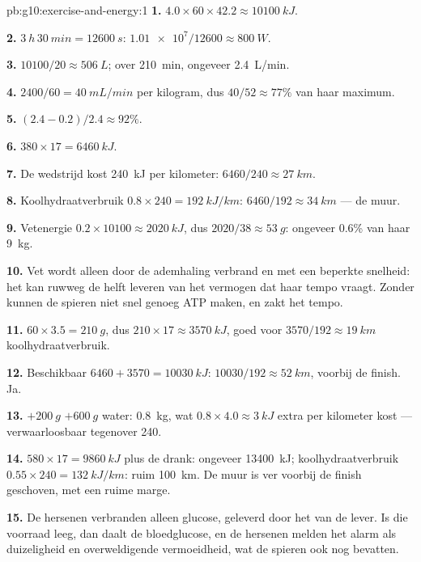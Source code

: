 \begin{solution}{pb:g10:exercise-and-energy:1}
\textbf{1.} $4.0 \times 60 \times 42.2 \approx \qty{10100}{kJ}$.

\textbf{2.} $\qty{3}{h}\,\qty{30}{min} = \qty{12600}{s}$:
$\num{1.01e7}/12600 \approx \qty{800}{W}$.

\textbf{3.} $10100/20 \approx \qty{506}{L}$; over \qty{210}{min},
ongeveer \qty{2.4}{L/min}.

\textbf{4.} $2400/60 = \qty{40}{mL/min}$ per kilogram, dus $40/52
\approx 77\%$ van haar maximum.

\textbf{5.} $(2.4 - 0.2)/2.4 \approx 92\%$.

\textbf{6.} $380 \times 17 = \qty{6460}{kJ}$.

\textbf{7.} De wedstrijd kost \qty{240}{kJ} per kilometer: $6460/240
\approx \qty{27}{km}$.

\textbf{8.} Koolhydraatverbruik $0.8 \times 240 = \qty{192}{kJ/km}$:
$6460/192 \approx \qty{34}{km}$ --- de muur.

\textbf{9.} Vetenergie $0.2 \times 10100 \approx \qty{2020}{kJ}$, dus
$2020/38 \approx \qty{53}{g}$: ongeveer 0.6\% van haar \qty{9}{kg}.

\textbf{10.} Vet wordt alleen door de ademhaling verbrand en met een
beperkte snelheid: het kan ruwweg de helft leveren van het vermogen dat
haar tempo vraagt. Zonder  kunnen de spieren niet snel genoeg
ATP maken, en zakt het tempo.

\textbf{11.} $60 \times 3.5 = \qty{210}{g}$, dus $210 \times 17 \approx
\qty{3570}{kJ}$, goed voor $3570/192 \approx \qty{19}{km}$
koolhydraatverbruik.

\textbf{12.} Beschikbaar  $6460 + 3570 = \qty{10030}{kJ}$:
$10030/192 \approx \qty{52}{km}$, voorbij de finish. Ja.

\textbf{13.} $+\qty{200}{g}$  $+ \qty{600}{g}$ water:
\qty{0.8}{kg}, wat $0.8 \times 4.0 \approx \qty{3}{kJ}$ extra per
kilometer kost --- verwaarloosbaar tegenover 240.

\textbf{14.}  $580 \times 17 = \qty{9860}{kJ}$ plus de drank:
ongeveer \qty{13400}{kJ}; koolhydraatverbruik $0.55 \times 240 =
\qty{132}{kJ/km}$: ruim \qty{100}{km}. De muur is ver voorbij de finish
geschoven, met een ruime marge.

\textbf{15.} De hersenen verbranden alleen glucose, geleverd door het
 van de lever. Is die voorraad leeg, dan daalt de bloedglucose,
en de hersenen melden het alarm als duizeligheid en overweldigende
vermoeidheid, wat de spieren ook nog bevatten.


\end{solution}

